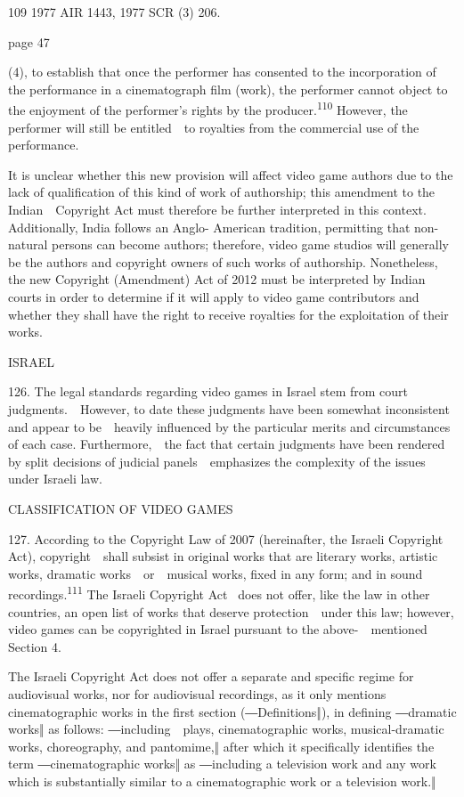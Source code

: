 \documentclass[
]{article}
\begin{document}
{109 }{1977 AIR 1443, 1977 SCR (3) 206.}

{page 47}

{(4), to establish that once the performer has consented to the
incorporation of the performance in a cinematograph film (work), the
performer cannot object to the enjoyment }{of the performer's rights by
the producer.}\textsuperscript{{110 }}{However, the performer will still
be entitled~~to royalties from the commercial use of the performance.}

{It is unclear whether this new provision will affect video game authors
due to the lack of qualification of this kind of work of authorship;
this amendment to the Indian~~}{Copyright Act }{must therefore be
further interpreted in this context. Additionally, India follows an
Anglo- American tradition, permitting that non-natural persons can
become }{authors}{; therefore, video game studios will generally be the
authors and copyright owners of such works of authorship. Nonetheless,
the new }{Copyright (Amendment) Act of 2012 }{must be interpreted by
Indian courts in order to determine if it will apply to video game
contributors and whether they shall have the right to receive royalties
for the exploitation of their works.}

{ISRAEL}

{126. }{The legal standards regarding video games in Israel stem from
court judgments.~~However, to date these judgments have been somewhat
inconsistent and appear to be~~heavily influenced by the particular
merits and circumstances of each case. Furthermore,~~the fact that
certain judgments have been rendered by split decisions of judicial
panels~~emphasizes the complexity of the issues under Israeli law.}

{CLASSIFICATION OF VIDEO GAMES}

{127. }{According to the }{Copyright Law of 2007 }{(hereinafter, the
Israeli }{Copyright Act}{), copyright~~shall subsist in original works
that are literary works, artistic works, dramatic works~~or~~musical
works, fixed in any form; and in sound recordings.}\textsuperscript{{111
}}{The Israeli }{Copyright Act }{~does not offer, like the law in other
countries, an open list of works that deserve protection~~under this
law; however, video games can be copyrighted in Israel pursuant to the
above-~~mentioned Section 4.}

{The Israeli }{Copyright Act }{does not offer a separate and specific
regime for audiovisual works, nor for audiovisual recordings, as it only
mentions cinematographic works in the }{first section (―Definitions‖),
in defining ―dramatic works‖ as follows: ―}{including~~plays,
cinematographic works, musical-dramati}{c works, choreography, and
pantomime,‖ }{after }{which it specifically identifies the term
―cinematographic works‖ as ―}{including a television work and any work
which is substantially similar to a cinematographic work or a television
work.}{‖}
\end{document}
